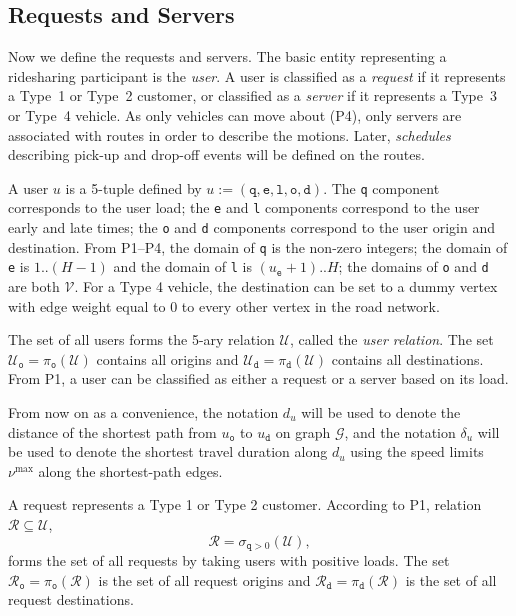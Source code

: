 \subsection{Requests and Servers}
\label{ch:1:sec:requests-and-servers}
Now we define the requests and servers.
The basic entity representing a ridesharing participant is the \emph{user}.  A
user is classified as a \emph{request} if it represents a Type~1 or Type~2
customer, or classified as a \emph{server} if it represents a Type~3 or Type~4
vehicle. As only vehicles can move about (P4), only servers are associated with
routes in order to describe the motions. Later, \emph{schedules} describing
pick-up and drop-off events will be defined on the routes.

A user $u$ is a 5-tuple defined by
${u:=(\texttt{q},\texttt{e},\texttt{l},\texttt{o},\texttt{d})}$.  The
\texttt{q} component corresponds to the user load; the \texttt{e} and
\texttt{l} components correspond to the user early and late times; the
\texttt{o} and \texttt{d} components correspond to the user origin and
destination.
From P1--P4, the domain of \texttt{q} is the non-zero integers; the domain of \texttt{e} is
$1..(H-1)$ and the domain of \texttt{l} is $(u_\texttt{e}+1)..H$; the domains
of \texttt{o} and \texttt{d} are both $\mathcal{V}$.
For a Type 4 vehicle, the destination can be set to a dummy vertex with edge
weight equal to 0 to every other vertex in the road network.

The set of all users forms the 5-ary relation $\mathcal{U}$, called
the \emph{user relation}.
The set
$\mathcal{U}_\texttt{o}=\pi_\texttt{o}(\mathcal{U})$ contains all origins and
$\mathcal{U}_\texttt{d}=\pi_\texttt{d}(\mathcal{U})$ contains all destinations.
From P1, a user can be classified as either a request or a server based on its load.

From now on as a convenience, the notation $d_u$ will be used to denote the distance of the
shortest path from $u_\texttt{o}$ to $u_\texttt{d}$ on graph $\mathcal{G}$, and
the notation $\delta_u$ will be used to denote the shortest travel duration
along $d_u$ using the speed limits $\nu^\textrm{max}$ along the shortest-path edges.

A request represents a Type 1 or Type 2 customer.
According to P1,
relation $\mathcal{R}\subseteq\mathcal{U}$,
$$\mathcal{R}=\sigma_{\texttt{q}>0}(\mathcal{U}),$$
forms the set of all requests by taking users with positive loads. The set
$\mathcal{R}_\texttt{o}=\pi_\texttt{o}(\mathcal{R})$ is the set of all request origins and
$\mathcal{R}_\texttt{d}=\pi_\texttt{d}(\mathcal{R})$ is the set of all request destinations.

